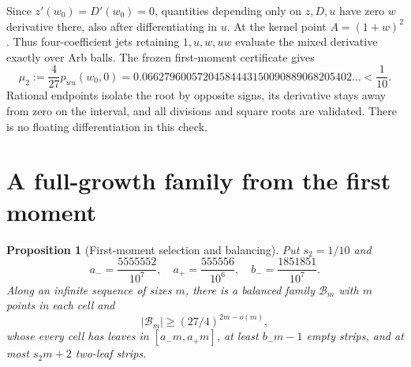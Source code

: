 \documentclass[11pt]{amsart}
\numberwithin{equation}{section}
\newtheorem{proposition}[theorem]{Proposition}
\theoremstyle{remark}\newtheorem{remark}[theorem]{Remark}
\begin{document}
Since $z'(w_0)=D'(w_0)=0$, quantities depending only on $z,D,u$ have zero $w$ derivative there, also after differentiating in $u$. At the kernel point $A=(1+w)^2$. Thus four-coefficient jets retaining $1,u,w,uw$ evaluate the mixed derivative exactly over Arb balls. The frozen first-moment certificate gives
\begin{equation}\label{eq:mu}
 \mu_2:=\frac4{27}p_{wu}(w_0,0)
 =0.06627960057204584443150090889068205402\ldots<\frac1{10}.
\end{equation}
Rational endpoints isolate the root by opposite signs, its derivative stays away from zero on the interval, and all divisions and square roots are validated. There is no floating differentiation in this check.

\section{A full-growth family from the first moment}
\begin{proposition}[First-moment selection and balancing]\label{prop:family}
Put $s_2=1/10$ and
\[
 a_-=\frac{5555552}{10^7},\quad a_+=\frac{555556}{10^6},\quad
 b_-=\frac{1851851}{10^7}.
\]
Along an infinite sequence of sizes $m$, there is a balanced family $\mathcal B_m$ with $m$ points in each cell and
\[
 |\mathcal B_m|\geq(27/4)^{2m-o(m)},
\]
whose every cell has leaves in $[a_-m,a_+m]$, at least $b_-m-1$ empty strips, and at most $s_2m+2$ two-leaf strips.
\end{proposition}
\end{document}
